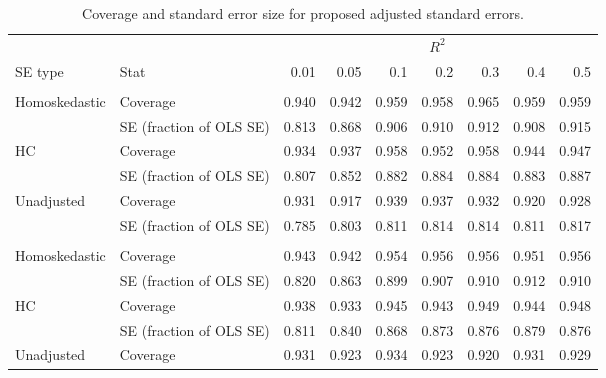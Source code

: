 \begin{table}

\begin{threeparttable}
\caption{Coverage and standard error size for proposed adjusted standard errors. \label{tab:se}}
\centering
\begin{tabular}[t]{llrrrrrrr}
\toprule
\multicolumn{2}{c}{ } & \multicolumn{7}{c}{$R^2$} \\
\cmidrule(l{3pt}r{3pt}){3-9}
SE type & Stat & 0.01 & 0.05 & 0.1 & 0.2 & 0.3 & 0.4 & 0.5\\
\midrule
\addlinespace[0.3em]
\multicolumn{9}{c}{$\mathbf{\alpha=-1}$}\\
\hspace{1em}Homoskedastic & Coverage & 0.940 & 0.942 & 0.959 & 0.958 & 0.965 & 0.959 & 0.959\\
\hspace{1em} & SE (fraction of OLS SE) & 0.813 & 0.868 & 0.906 & 0.910 & 0.912 & 0.908 & 0.915\\
\hspace{1em}HC & Coverage & 0.934 & 0.937 & 0.958 & 0.952 & 0.958 & 0.944 & 0.947\\
\hspace{1em} & SE (fraction of OLS SE) & 0.807 & 0.852 & 0.882 & 0.884 & 0.884 & 0.883 & 0.887\\
\hspace{1em}Unadjusted & Coverage & 0.931 & 0.917 & 0.939 & 0.937 & 0.932 & 0.920 & 0.928\\
\hspace{1em} & SE (fraction of OLS SE) & 0.785 & 0.803 & 0.811 & 0.814 & 0.814 & 0.811 & 0.817\\
\addlinespace[0.3em]
\multicolumn{9}{c}{$\mathbf{\alpha=1}$}\\
\hspace{1em}Homoskedastic & Coverage & 0.943 & 0.942 & 0.954 & 0.956 & 0.956 & 0.951 & 0.956\\
\hspace{1em} & SE (fraction of OLS SE) & 0.820 & 0.863 & 0.899 & 0.907 & 0.910 & 0.912 & 0.910\\
\hspace{1em}HC & Coverage & 0.938 & 0.933 & 0.945 & 0.943 & 0.949 & 0.944 & 0.948\\
\hspace{1em} & SE (fraction of OLS SE) & 0.811 & 0.840 & 0.868 & 0.873 & 0.876 & 0.879 & 0.876\\
\hspace{1em}Unadjusted & Coverage & 0.931 & 0.923 & 0.934 & 0.923 & 0.920 & 0.931 & 0.929\\

\end{tabular}
\end{threeparttable}
\end{table}
